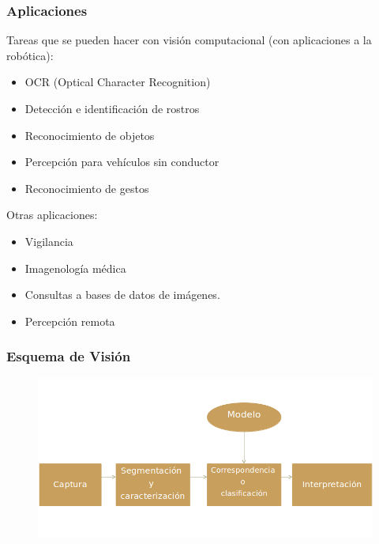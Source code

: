 \begin{frame}\frametitle{Aplicaciones}
  Tareas que se pueden hacer con visión computacional (con aplicaciones a la robótica):
  \begin{itemize}
  \item OCR (Optical Character Recognition)
  \item Detección e identificación de rostros
  \item Reconocimiento de objetos
  \item Percepción para vehículos sin conductor
  \item Reconocimiento de gestos
  \end{itemize}
  Otras aplicaciones:
  \begin{itemize}
  \item Vigilancia
  \item Imagenología médica
  \item Consultas a bases de datos de imágenes.
  \item Percepción remota
  \end{itemize}
\end{frame}


\begin{frame}\frametitle{Esquema de Visión}
  \begin{figure}
    \centering
    \includegraphics[width=1.0\textwidth]{Figures/VisionGeneralProcess.png}
  \end{figure}
\end{frame}


